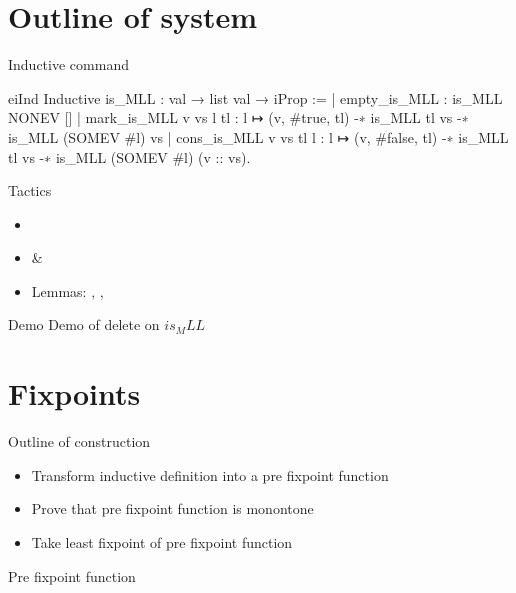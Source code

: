 \documentclass[aspectratio=169]{beamer}
\begin{document}
\section{Outline of system}
\begin{frame}[fragile]{Inductive command}
    \begin{coqcode}
        eiInd
        Inductive is_MLL : val → list val → iProp :=
            | empty_is_MLL : is_MLL NONEV []
            | mark_is_MLL v vs l tl : 
              l ↦ (v, #true, tl) -∗ is_MLL tl vs -∗ 
              is_MLL (SOMEV #l) vs
            | cons_is_MLL v vs tl l : 
              l ↦ (v, #false, tl) -∗ is_MLL tl vs -∗ 
              is_MLL (SOMEV #l) (v :: vs).
    \end{coqcode}
\end{frame}

\begin{frame}[fragile]{Tactics}
    \begin{itemize}
        \item {}
        \item {} \& 
        \item Lemmas: , , 
    \end{itemize}
\end{frame}

\begin{frame}{Demo}
    Demo of delete on $is_MLL$
\end{frame}

\section{Fixpoints}
\begin{frame}{Outline of construction}
    \begin{itemize}
        \item Transform inductive definition into a pre fixpoint function
        \item Prove that pre fixpoint function is monontone
        \item Take least fixpoint of pre fixpoint function
    \end{itemize}
\end{frame}

\begin{frame}{Pre fixpoint function}

\end{frame}
\end{document}
